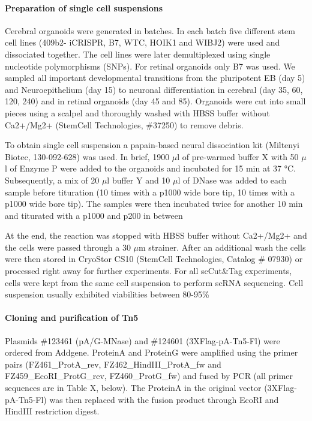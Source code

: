 \paragraph{Preparation of single cell suspensions}
Cerebral organoids were generated in batches. In each batch five different stem cell lines (409b2- iCRISPR, B7, WTC, HOIK1 and WIBJ2) were used and dissociated together. The cell lines were later demultiplexed using single nucleotide polymorphisms (SNPs). For retinal organoids only B7 was used. We sampled all important developmental transitions from the pluripotent EB (day 5) and Neuroepithelium (day 15) to neuronal differentiation in cerebral (day 35, 60, 120, 240) and  in retinal organoids (day 45 and 85). Organoids were cut into small pieces using a scalpel and thoroughly washed with HBSS buffer without Ca2+/Mg2+ (StemCell Technologies, \#37250) to remove debris. 

To obtain single cell suspension a papain-based neural dissociation kit (Miltenyi Biotec, 130-092-628) was used. In brief, 1900 $\mu$l of pre-warmed buffer X with 50 $\mu$l of Enzyme P were added to the organoids and incubated for 15 min at 37 °C. Subsequently, a mix of 20 $\mu$l buffer Y and 10 $\mu$l of DNase was added to each sample before tituration (10 times with a p1000 wide bore tip, 10 times with a p1000 wide bore tip). The samples were then incubated twice for another 10 min and titurated with a p1000 and p200 in between
 
At the end, the reaction was stopped with HBSS buffer without Ca2+/Mg2+ and the cells were passed through a 30 $\mu$m strainer. After an additional wash the cells were then stored in CryoStor CS10 (StemCell Technologies, Catalog \# 07930) or processed right away for further experiments. For all scCut\&Tag experiments, cells were kept from the same cell suspension to perform scRNA sequencing. Cell suspension usually exhibited viabilities between 80-95\%

\paragraph{Cloning and purification of Tn5}
Plasmids \#123461 (pA/G-MNase) and \#124601 (3XFlag-pA-Tn5-Fl) were ordered from Addgene. ProteinA and ProteinG were amplified using the primer pairs (FZ461\_ProtA\_rev,  
FZ462\_HindIII\_ProtA\_fw and FZ459\_EcoRI\_ProtG\_rev, FZ460\_ProtG\_fw) and fused by PCR (all primer sequences are in Table X, below). The ProteinA in the original vector (3XFlag-pA-Tn5-Fl)  was then replaced with the fusion product through EcoRI and HindIII restriction digest. 

